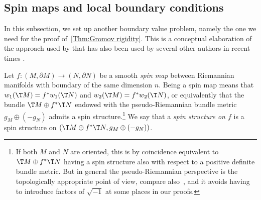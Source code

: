 \documentclass[a4paper,11pt]{amsart}
\numberwithin{equation}{section}
\begin{document}
\subsection{Spin maps and local boundary conditions}\label{subsec:spin_maps}
In this subsection, we set up another boundary value problem, namely the one we need for the proof of~\cref{Thm:Gromov rigidity}.
This is a conceptual elaboration of the approach used by \textcite{Lott} that has also been used by several other authors in recent times \cite{brendle2023rigidity, brendle2024scalar, wang2023gromovs}. 

Let \(f \colon (M, \partial M) \to (N, \partial N)\) be a smooth \emph{spin map} between Riemannian manifolds with boundary of the same dimension \(n\).
Being a spin map means that \(w_1(\T M) = f^\ast w_1( \T N)\) and \(w_2(\T M) = f^\ast w_2( \T N)\), or equivalently that the bundle \(\T M \oplus f^\ast \T N\) endowed with the pseudo-Riemannian bundle metric \(g_M \oplus (-g_N)\) admits a spin structure.\footnote{If both \(M\) and \(N\) are oriented, this is by coincidence equivalent to \(\T M \oplus f^\ast \T N\) having a spin structure also with respect to a positive definite bundle metric.
But in general the pseudo-Riemannian perspective is the topologically appropriate point of view, compare also~\textcite[\S 1.2 and \S 4]{tony2024scalar}, and it avoids having to introduce factors of \(\sqrt{-1}\) at some places in our proofs.}
We say that a \emph{spin structure on \(f\)} is a spin structure on \((\T M \oplus f^\ast \T N, g_M \oplus (-g_N))\).
\end{document}
